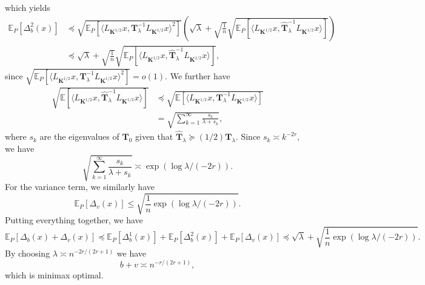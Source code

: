 \documentclass[11pt,a4paper]{article}
\renewcommand{\hat}{\widehat}
\theoremstyle{definition}
\theoremstyle{plain}
\theoremstyle{remark}
\begin{document}
which yields
\begin{align*}
	\mathbb E_P\left[\Delta_b^2(x)\right]&\preceq \sqrt{\mathbb{E}_P\left[\langle L_{\boldsymbol K^{1/2}}x,{\boldsymbol{T}}_{\lambda}^{-1} L_{\boldsymbol K^{1/2}} x\rangle^2\right]}\left(\sqrt{\lambda}+\sqrt{\frac{1}{n}}\sqrt{\mathbb{E}_P\left[{\langle L_{\boldsymbol{K}^{1/2}}x,\hat{\boldsymbol T}_\lambda^{-1} L_{\boldsymbol K^{1/2}}x\rangle}\right]}\right)\\
	&\preceq \sqrt{\lambda}+\sqrt{\frac{1}{n}}\sqrt{\mathbb{E}_P\left[{\langle L_{\boldsymbol{K}^{1/2}}x,\hat{\boldsymbol T}_\lambda^{-1} L_{\boldsymbol K^{1/2}}x\rangle}\right]},
\end{align*}
since \(\sqrt{\mathbb{E}_P\left[\langle L_{\boldsymbol K^{1/2}}x,{\boldsymbol{T}}_{\lambda}^{-1} L_{\boldsymbol K^{1/2}} x\rangle^2\right]}=o(1).\) 
We further have
\begin{align*}
\sqrt{\mathbb E\left[{{\langle L_{\boldsymbol{K}^{1/2}}x,\hat{\boldsymbol T}_\lambda^{-1}L_{\boldsymbol K^{1/2}}x\rangle}}\right]}
	&\preceq\sqrt{\mathbb E\left[{{\langle L_{\boldsymbol{K}^{1/2}}x,{\boldsymbol T}_\lambda^{-1} L_{\boldsymbol K^{1/2}}x\rangle}}\right]}\\
	&=\sqrt{\sum_{k=1}^{\infty}\frac{s_k}{\lambda+s_k}},
\end{align*}
where $s_k$ are the eigenvalues of $\boldsymbol{T}_0$ given that $\hat{\boldsymbol T}_{\lambda}\succeq (1/2) \boldsymbol T_\lambda.$ Since $s_k\asymp k^{-2r},$ we have
\[\sqrt{\sum_{k=1}^{\infty}\frac{s_k}{\lambda+s_k}}\asymp \exp(\log \lambda/(-2r)).\]
For the variance term, we similarly have 
\[\mathbb{E}_P\left[\Delta_v(x)\right]\leq \sqrt{\frac{1}{n}\exp(\log\lambda/(-2r))}.\]
Putting everything together, we have
\[\mathbb{E}_P\left[\Delta_b(x)+\Delta_v(x)\right]\preceq\mathbb{E}_P\left[\Delta_b^1(x)\right] +\mathbb{E}_P\left[\Delta_b^2(x)\right]+\mathbb{E}_P\left[\Delta_v(x)\right]\preceq\sqrt{\lambda}+\sqrt{\frac{1}{n}\exp(\log \lambda/(-2r))}.\]
By choosing $\lambda\asymp n^{-2r/(2r+1)}$ we have 
\[b+v\asymp n^{-r/(2r+1)},\]
which is minimax optimal.




\end{document}
